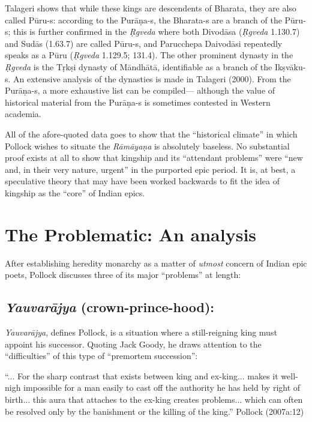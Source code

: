 Talageri shows that while these kings are descendents of Bharata, they are also called Pūru-s: according to the Purāṇa-s, the Bharata-s are a branch of the Pūru-s; this is further confirmed in the {\sl Ṛgveda} where both Divodāsa ({\sl Ṛgveda} 1.130.7) and Sudās (1.63.7) are called Pūru-s, and Parucchepa Daivodāsi repeatedly speaks as a Pūru ({\sl Ṛgveda} 1.129.5; 131.4). The other prominent dynasty in the {\sl Ṛgveda} is the Tṛkṣi dynasty of Māndhātā, identifiable as a branch of the Ikṣvāku-s. An extensive analysis of the dynasties is made in Talageri (2000). From the Purāṇa-s, a more exhaustive list can be compiled--- although the value of historical material from the Purāṇa-s is sometimes contested in Western academia.

All of the afore-quoted data goes to show that the “historical climate” in which Pollock wishes to situate the {\sl Rāmāyaṇa} is absolutely baseless. No substantial proof exists at all to show that kingship and its “attendant problems” were “new and, in their very nature, urgent” in the purported epic period. It is, at best, a speculative theory that may have been worked backwards to fit the idea of kingship as the “core” of Indian epics.\\[-21pt]  

\section{The Problematic: An analysis}\label{sec1.2}

After establishing heredity monarchy as a matter of {\sl utmost} concern of Indian epic poets, Pollock discusses three of its major “problems” at length:\\[-21pt]   

\subsection{{\sl\bfseries Yauvarājya} (crown-prince-hood):}\label{sec1.2.1}

{\sl Yauvarājya}, defines Pollock, is a situation where a still-reigning king must appoint his successor. Quoting Jack Goody, he draws attention to the “difficulties” of this type of “premortem succession”:

\begin{myquote}
 “... For the sharp contrast that exists between king and ex-king... makes it well-nigh impossible for a man easily to cast off the authority he has held by right of birth... this aura that attaches to the ex-king creates problems... which can often be resolved only by the banishment or the killing of the king.” 
\hfill Pollock (2007a:12)
\end{myquote}

